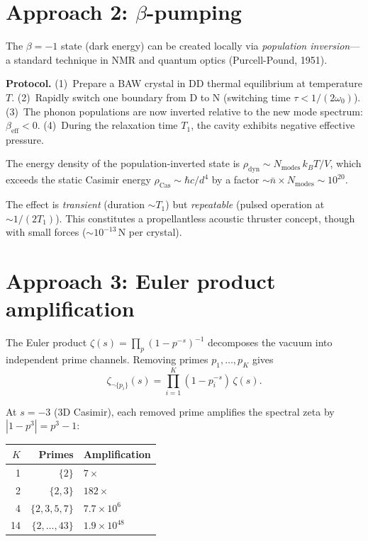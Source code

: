 \documentclass[aps,prd,twocolumn,superscriptaddress,nofootinbib]{revtex4-2}
\begin{document}
\section{Approach 2: $\beta$-pumping}
\label{sec:pumping}

The $\beta = -1$ state (dark energy) can be created locally via
\emph{population inversion}---a standard technique in NMR and
quantum optics (Purcell-Pound, 1951).

\textbf{Protocol.}
(1)~Prepare a BAW crystal in DD thermal equilibrium at temperature $T$.
(2)~Rapidly switch one boundary from D to N (switching time
$\tau < 1/(2\omega_0)$).
(3)~The phonon populations are now inverted relative to the new
mode spectrum: $\beta_{\mathrm{eff}} < 0$.
(4)~During the relaxation time $T_1$, the cavity exhibits negative
effective pressure.

The energy density of the population-inverted state is
$\rho_{\mathrm{dyn}} \sim N_{\mathrm{modes}} \, k_B T / V$,
which exceeds the static Casimir energy $\rho_{\mathrm{Cas}}
\sim \hbar c / d^4$ by a factor $\sim \bar{n} \times N_{\mathrm{modes}}
\sim 10^{20}$.

The effect is \emph{transient} (duration $\sim T_1$) but
\emph{repeatable} (pulsed operation at $\sim 1/(2T_1)$).
This constitutes a propellantless acoustic thruster concept,
though with small forces ($\sim 10^{-13}$\,N per crystal).

\section{Approach 3: Euler product amplification}
\label{sec:euler}

The Euler product
$\zeta(s) = \prod_p (1 - p^{-s})^{-1}$
decomposes the vacuum into independent prime channels.
Removing primes $p_1, \ldots, p_K$ gives
\begin{equation}
  \zeta_{\neg\{p_i\}}(s) = \prod_{i=1}^K (1 - p_i^{-s}) \, \zeta(s).
  \label{eq:euler_muted}
\end{equation}

At $s = -3$ (3D Casimir), each removed prime amplifies the spectral
zeta by $|1 - p^3| = p^3 - 1$:

\begin{center}
\begin{tabular}{rrl}
\toprule
$K$ & Primes & Amplification \\
\midrule
1 & $\{2\}$ & $7\times$ \\
2 & $\{2,3\}$ & $182\times$ \\
4 & $\{2,3,5,7\}$ & $7.7 \times 10^6$ \\
14 & $\{2,\ldots,43\}$ & $1.9 \times 10^{48}$ \\
\bottomrule
\end{tabular}
\end{center}
\end{document}
